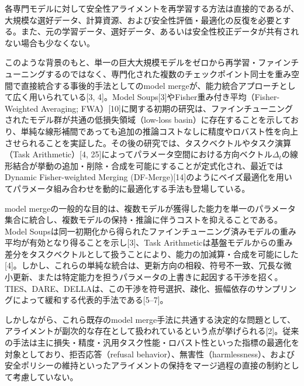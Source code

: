 \documentclass{article}
\begin{document}
各専門モデルに対して安全性アライメントを再学習する方法は直接的であるが、大規模な選好データ、計算資源、および安全性評価・最適化の反復を必要とする。また、元の学習データ、選好データ、あるいは安全性校正データが共有されない場合も少なくない。

このような背景のもと、単一の巨大大規模モデルをゼロから再学習・ファインチューニングするのではなく、専門化された複数のチェックポイント同士を重み空間で直接統合する事後的手法としてのmodel mergeが、能力統合アプローチとして広く用いられている[3, 4]。Model Soups[3]やFisher重み付き平均（Fisher-Weighted Averaging; FWA）[10]に関する初期の研究は、ファインチューニングされたモデル群が共通の低損失領域（low-loss basin）に存在することを示しており、単純な線形補間であっても追加の推論コストなしに精度やロバスト性を向上させられることを実証した。その後の研究では、タスクベクトルやタスク演算（Task Arithmetic）[4, 25]によってパラメータ空間における方向ベクトル$\Delta_t$の線形結合が挙動の追加・削除・合成を可能にすることが定式化され、最近ではDynamic Fisher-weighted Merging (DF-Merge)[14]のようにベイズ最適化を用いてパラメータ組み合わせを動的に最適化する手法も登場している。

model mergeの一般的な目的は、複数モデルが獲得した能力を単一のパラメータ集合に統合し、複数モデルの保持・推論に伴うコストを抑えることである。Model Soupsは同一初期化から得られたファインチューニング済みモデルの重み平均が有効となり得ることを示し[3]、Task Arithmeticは基盤モデルからの重み差分をタスクベクトルとして扱うことにより、能力の加減算・合成を可能にした[4]。しかし、これらの単純な統合は、更新方向の相殺、符号不一致、冗長な微小更新、または特定能力を担うパラメータの上書きに起因する干渉を招く。TIES、DARE、DELLAは、この干渉を符号選択、疎化、振幅依存のサンプリングによって緩和する代表的手法である[5--7]。

しかしながら、これら既存のmodel merge手法に共通する決定的な問題として、アライメントが副次的な存在として扱われているという点が挙げられる[2]。従来の手法は主に損失・精度・汎用タスク性能・ロバスト性といった指標の最適化を対象としており、拒否応答（refusal behavior）、無害性（harmlessness）、および安全ポリシーの維持といったアライメントの保持をマージ過程の直接の制約として考慮していない。
\end{document}
